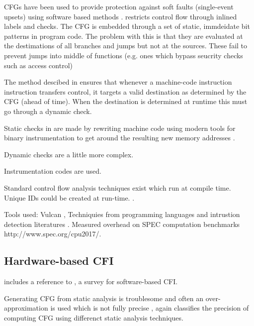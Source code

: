 CFGs have been used to provide protection against soft faults (single-event upsets) using software based methods \cite{Oh2002} \cite{Sharma2012} \cite{Venkatasubramanian2003}. 
\cite{Abadi2005} restricts control flow through inlined labels and checks. The CFG is embedded through a set of static, immdeidate bit patterns in program code. The problem with this is that they are evaluated at the destimations of all branches and jumps but not at the sources. These fail to prevent jumps into middle of functions (e.g. ones which bypass seucrity checks such as access control)

The method descibed in \cite{Abadi2005} ensures that whenever a machine-code instruction instruction transfers control, it targets a valid destination as determined by the CFG (ahead of time). When the destination is determined at runtime this must go through a dynamic check.

Static checks in \cite{Abadi2005} are made by rewriting machine code using modern tools for binary instrumentation to get around the resulting new memory addresses \cite{Edwards2001} \cite{Srivastava1994}.

Dynamic checks are a little more complex.  

Instrumentation codes are used. 

Standard control flow analysis techniques exist \cite{AhoAlfredV.2014C:pt} \cite{Atkinson} \cite{Wagner2002} which run at compile time. Unique IDs could be created at run-time. .

Tools used: Vulcan \cite{Edwards2001}, Techniquies from programming languages and intrustion detection literatures \cite{AhoAlfredV.2014C:pt} \cite{Feng2003} \cite{Gopalakrishna2005} \cite{Wagner2002}. Measured overhead on SPEC computation benchmarks http://www.spec.org/cpu2017/.

\subsection{Hardware-based CFI}

\cite{DeClercq2017} includes a reference to \cite{Burow} , a survey for software-based CFI.

Generating CFG from static analysis is troublesome and often an over-approximation is used which is not fully precise \cite{Carlini2015} \cite{Kinder2012}, again \cite{Burow} classifies the precision of computing CFG using differenct static analysis techniques.

